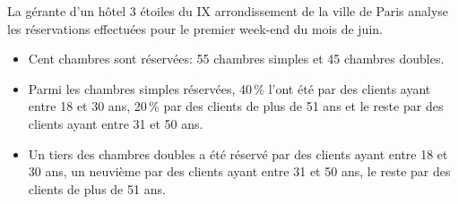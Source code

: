 \medskip



\exo 

La gérante d'un hôtel 3 étoiles du IX arrondissement de la ville de Paris analyse les
réservations effectuées pour le premier week-end du mois de juin.

\begin{itemize}
\item[$\bullet~~$] Cent chambres sont réservées: 55 chambres simples et 45 chambres doubles.
\item[$\bullet~~$] Parmi les chambres simples réservées, 40\,\% l'ont été par des clients ayant entre
18 et 30 ans, 20\,\% par des clients de plus de 51 ans et le reste par des clients ayant
entre 31 et 50 ans.
\item[$\bullet~~$] Un tiers des chambres doubles a été réservé par des clients ayant entre 18 et
30 ans, un neuvième par des clients ayant entre 31 et 50 ans, le reste par des clients de
plus de 51 ans.
\end{itemize}
\setlength\parindent{0mm}


